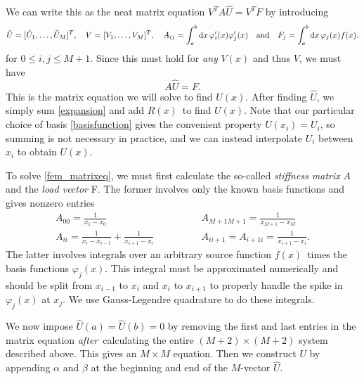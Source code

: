 We can write this as the neat matrix equation $V^T A \hat{U} = V^T F$ by introducing
\begin{equation*}
	\hat{U} = [\hat{U}_1, \dots, \hat{U}_M]^T,
	\quad
	V = [V_1, \dots, V_M]^T,
	\quad
	A_{ij} = \integral{\varphi'_i(x) \varphi'_j(x)}{x}{a}{b}
	\quad \text{and} \quad
	F_j = \integral{\varphi_j(x) f(x)}{x}{a}{b}.
\end{equation*}
for $0 \leq i, j \leq M+1$.
Since this must hold for \emph{any} $V(x)$ and thus $V$, we must have
\begin{equation}
	A \hat{U} = F.
	\label{fem_matrixeq}
\end{equation}
This is the matrix equation we will solve to find $U(x)$.
After finding $\hat{U}$, we simply sum \ref{expansion} and add $R(x)$ to find $U(x)$.
Note that our particular choice of basis \ref{basisfunction} gives the convenient property $U(x_i) = U_i$, so summing is not necessary in practice, and we can instead interpolate $U_i$ between $x_i$ to obtain $U(x)$.

To solve \ref{fem_matrixeq}, we must first calculate the so-called \emph{stiffness matrix} $A$ and the \emph{load vector} F.
The former involves only the known basis functions and gives nonzero entries
\begin{align*}
	A_{00} = \frac{1}{x_1 - x_0}                           \qquad & \qquad A_{M+1 M+1} = \frac{1}{x_{M+1}-x_M} \\
	A_{ii} = \frac{1}{x_i-x_{i-1}} + \frac{1}{x_{i+1}-x_i} \qquad & \qquad A_{i i+1} = A_{i+1 i} = \frac{1}{x_{i+1}-x_i}.
\end{align*}
The latter involves integrals over an arbitrary source function $f(x)$ times the basis functions $\varphi_j(x)$.
This integral must be approximated numerically and should be split from $x_{i-1}$ to $x_i$ and $x_i$ to $x_{i+1}$ to properly handle the spike in $\varphi_j(x)$ at $x_j$.
We use Gauss-Legendre quadrature to do these integrals. \cite{scipy_fixed_quad}

We now impose $\hat{U}(a) = \hat{U}(b) = 0$ by removing the first and last entries in the matrix equation \emph{after} calculating the entire $(M+2) \times (M+2)$ system described above.
This gives an $M \times M$ equation.
Then we construct $U$ by appending $\alpha$ and $\beta$ at the beginning and end of the $M$-vector $\hat{U}$.

